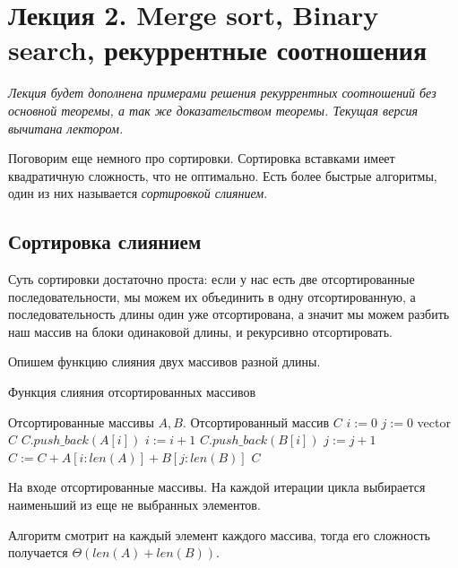 \documentclass[../book.tex]{subfiles}
\begin{document}
	\section{Лекция 2. Merge sort, Binary search, рекуррентные соотношения}
	
	\textit{Лекция будет дополнена примерами решения рекуррентных соотношений без основной теоремы, а так же доказательством теоремы. Текущая версия вычитана лектором.}

	Поговорим еще немного про сортировки. Сортировка вставками имеет квадратичную сложность, что не оптимально. Есть более быстрые алгоритмы, один из них называется \textit{сортировкой слиянием}.
	
	\subsection{Сортировка слиянием}
	
	Суть сортировки достаточно проста: если у нас есть две отсортированные последовательности, мы можем их объединить в одну отсортированную, а последовательность длины один уже отсортирована, а значит мы можем разбить наш массив на блоки одинаковой длины, и рекурсивно отсортировать.
	
	
	Опишем функцию слияния двух массивов разной длины.
	\begin{algorithm}[H]
		\caption{Функция слияния отсортированных массивов}
		\begin{algorithmic}[1]
			\Require Отсортированные массивы $A, B$.
			\Ensure Отсортированный массив $C$
				\State $ i := 0 $
				\State $ j := 0 $
				\State vector $C$
						\State $C.push\_back(A[i])$
						\State $i := i + 1$
					\Else
						\State $C.push\_back(B[i])$
						\State $j := j + 1$
					\EndIf
				\EndWhile
				\State $ C := C + A[i:len(A)] + B[j:len(B)]$
				\State \Return $C$
			\EndFunction
		\end{algorithmic}
	\end{algorithm}

		
	\begin{proof_cor}
		На входе отсортированные массивы. На каждой итерации цикла выбирается наименьший из еще не выбранных элементов.
	\end{proof_cor}
	\begin{time}
		Алгоритм смотрит на каждый элемент каждого массива, тогда его сложность получается $\Theta(len(A) + len(B))$.
	\end{time}	
\end{document}
